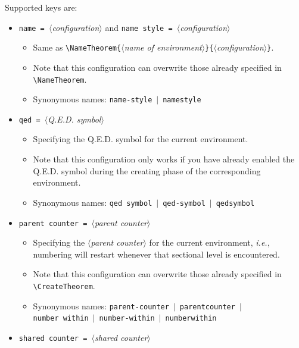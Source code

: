 \documentclass[classical]{einfart}
\newcommand{\meta}[1]{$\langle${\normalfont\itshape#1}$\rangle$}
\newcommand{\commandoption}[1]{\textcolor{code-keys}{\texttt{#1}}}
\begin{document}
Supported keys are:
\vspace{-.2\baselineskip}
\begin{itemize}[label=,leftmargin=1.25em,itemindent=-1.25em]
    \item \commandoption{name}\lstinline| = |\meta{configuration} and \commandoption{name style}\lstinline| = |\meta{configuration}
        \begin{itemize}
            \item Same as \lstinline|\NameTheorem{|\meta{name of environment}\lstinline|}{|\meta{configuration}\lstinline|}|.
            \item Note that this configuration can overwrite those already specified in \lstinline|\NameTheorem|.
            \item Synonymous names: \commandoption{name-style} \,$|$\, \commandoption{namestyle}
        \end{itemize}
    \item \commandoption{qed}\lstinline| = |\meta{Q.E.D. symbol}
        \begin{itemize}
            \item Specifying the Q.E.D. symbol for the current environment.
            \item Note that this configuration only works if you have already enabled the Q.E.D. symbol during the creating phase of the corresponding environment.
            \item Synonymous names: \commandoption{qed symbol} \,$|$\, \commandoption{qed-symbol} \,$|$\, \commandoption{qedsymbol}
        \end{itemize}
    \item \commandoption{parent counter}\lstinline| = |\meta{parent counter}
        \begin{itemize}
            \item Specifying the \meta{parent counter} for the current environment, \emph{i.e.}, numbering will restart whenever that sectional level is encountered.
            \item Note that this configuration can overwrite those already specified in \lstinline|\CreateTheorem|.
            \item Synonymous names: \commandoption{parent-counter} \,$|$\, \commandoption{parentcounter} \,$|$\, \\\phantom{Synonymous names: }\commandoption{number within} \,$|$\, \commandoption{number-within} \,$|$\, \commandoption{numberwithin}
        \end{itemize}
    \item \commandoption{shared counter}\lstinline| = |\meta{shared counter}

\end{itemize}
\end{document}
